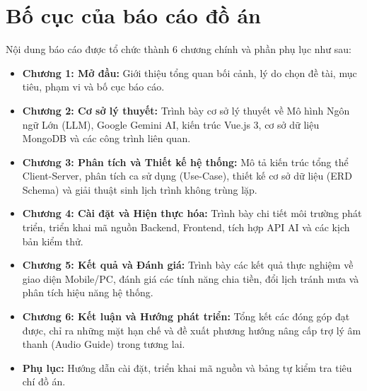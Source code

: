 \section{Bố cục của báo cáo đồ án}

Nội dung báo cáo được tổ chức thành 6 chương chính và phần phụ lục như sau:

\begin{itemize}
    \item \textbf{Chương 1: Mở đầu:} Giới thiệu tổng quan bối cảnh, lý do chọn đề tài, mục tiêu, phạm vi và bố cục báo cáo.
    \item \textbf{Chương 2: Cơ sở lý thuyết:} Trình bày cơ sở lý thuyết về Mô hình Ngôn ngữ Lớn (LLM), Google Gemini AI, kiến trúc Vue.js 3, cơ sở dữ liệu MongoDB và các công trình liên quan.
    \item \textbf{Chương 3: Phân tích và Thiết kế hệ thống:} Mô tả kiến trúc tổng thể Client-Server, phân tích ca sử dụng (Use-Case), thiết kế cơ sở dữ liệu (ERD Schema) và giải thuật sinh lịch trình không trùng lặp.
    \item \textbf{Chương 4: Cài đặt và Hiện thực hóa:} Trình bày chi tiết môi trường phát triển, triển khai mã nguồn Backend, Frontend, tích hợp API AI và các kịch bản kiểm thử.
    \item \textbf{Chương 5: Kết quả và Đánh giá:} Trình bày các kết quả thực nghiệm về giao diện Mobile/PC, đánh giá các tính năng chia tiền, đổi lịch tránh mưa và phân tích hiệu năng hệ thống.
    \item \textbf{Chương 6: Kết luận và Hướng phát triển:} Tổng kết các đóng góp đạt được, chỉ ra những mặt hạn chế và đề xuất phương hướng nâng cấp trợ lý âm thanh (Audio Guide) trong tương lai.
    \item \textbf{Phụ lục:} Hướng dẫn cài đặt, triển khai mã nguồn và bảng tự kiểm tra tiêu chí đồ án.
\end{itemize}
